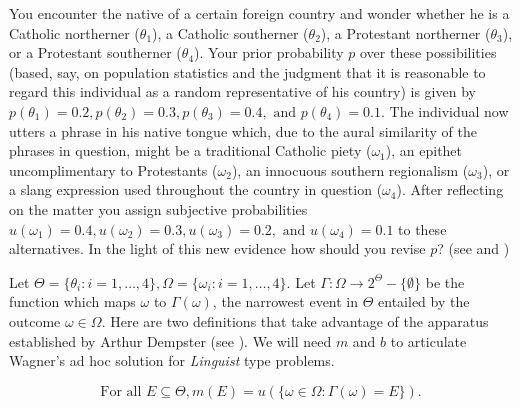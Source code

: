 \documentclass[11pt]{article}
\begin{document}


\begin{quotex}
  You encounter the native of a certain foreign country and wonder
  whether he is a Catholic northerner ($\theta_{1}$), a Catholic
  southerner ($\theta_{2}$), a Protestant northerner ($\theta_{3}$),
  or a Protestant southerner ($\theta_{4}$). Your prior probability
  $p$ over these possibilities (based, say, on population statistics
  and the judgment that it is reasonable to regard this individual as
  a random representative of his country) is given by
  $p(\theta_{1})=0.2,p(\theta_{2})=0.3,p(\theta_{3})=0.4,\mbox{ and
  }p(\theta_{4})=0.1$. The individual now utters a phrase in his
  native tongue which, due to the aural similarity of the phrases in
  question, might be a traditional Catholic piety ($\omega_{1}$), an
  epithet uncomplimentary to Protestants ($\omega_{2}$), an innocuous
  southern regionalism ($\omega_{3}$), or a slang expression used
  throughout the country in question ($\omega_{4}$). After reflecting
  on the matter you assign subjective probabilities
  $u(\omega_{1})=0.4,u(\omega_{2})=0.3,u(\omega_{3})=0.2,\mbox{ and
  }u(\omega_{4})=0.1$ to these alternatives. In the light of this new
  evidence how should you revise $p$? (see 
  and )
\end{quotex}

Let $\Theta=\{\theta_{i}:i=1,\ldots,4\},\Omega=\{\omega_{i}:i=1,\ldots,4\}$.
Let $\Gamma:\Omega\rightarrow{}2^{\Theta}-\{\emptyset\}$ be the function
which maps $\omega$ to $\Gamma(\omega)$, the narrowest event in
$\Theta$ entailed by the outcome $\omega\in\Omega$. Here are two
definitions that take advantage of the apparatus established by Arthur
Dempster (see ). We will need $m$ and $b$ to
articulate Wagner's ad hoc solution for \emph{Linguist} type problems.

\begin{equation}
  \mbox{For all }E\subseteq{}\Theta, m(E)=u(\{\omega\in\Omega:\Gamma(\omega)=E\})\label{eq:mof}.
\end{equation}
\end{document}
